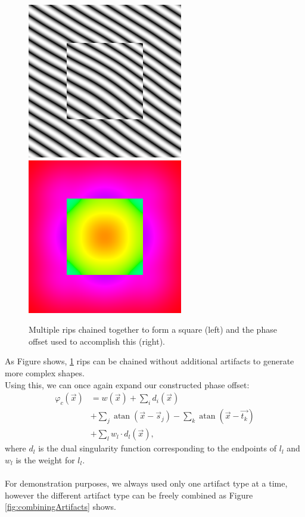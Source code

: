 \documentclass{utue} %
\DeclareMathOperator{\atan}{atan}
\begin{document}
\begin{figure}[ht]
  \centering
  \includegraphics[width=0.49\linewidth]{images/ripChaining}
  \includegraphics[width=0.49\linewidth]{images/ripChainingPhase}
  \caption{Multiple rips chained together to form a square (left) and the phase offset used to accomplish this (right).}\label{fig:ripChaining}
\end{figure}

As Figure shows, \ref{fig:ripChaining} rips can be chained without additional artifacts to generate more complex shapes.\\
Using this, we can once again expand our constructed phase offset:
\begin{align*}
  \varphi_c(\vec{x})&=w(\vec{x}) +\sum_i d_i(\vec{x})\\
  & + \sum_j \atan(\vec{x}-\vec{s}_j) - \sum_k \atan(\vec{x}-\vec{t_k})\\
  & + \sum_l w_l\cdot d_l(\vec{x}),
\end{align*}
where $d_l$ is the dual singularity function corresponding to the endpoints of $l_l$ and $w_l$ is the weight for $l_l$.\\
\\
For demonstration purposes, we always used only one artifact type at a time, however the different artifact type can be freely combined as Figure \ref{fig:combiningArtifacts} shows.
\end{document}
